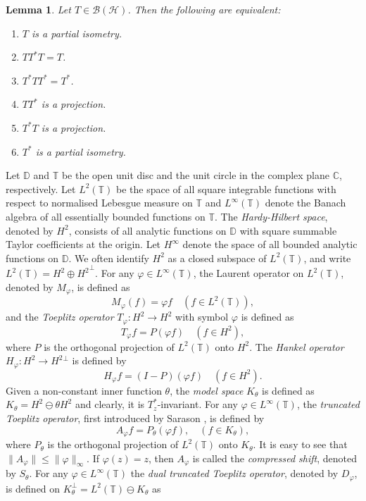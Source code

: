\documentclass[12pt]{amsart}
\newcommand{\clb}{\mathcal{B}}
\newcommand{\clh}{\mathcal{H}}
\newcommand{\C}{\mathbb{C}}
\newcommand{\D}{\mathbb{D}}
\newcommand{\T}{\mathbb{T}}
\newcommand{\h}{{H}^2}
\theoremstyle{definition}
\theoremstyle{plain}
\newtheorem{lem}[thm]{Lemma}
\theoremstyle{definition}
\numberwithin{equation}{section}
\let\phi=\varphi
\begin{document}
\begin{lem} \label{Lem:partial isometry equivalences}
Let $T\in \clb(\clh)$. Then the following are equivalent:
\begin{enumerate}
			\item $T$ is a partial isometry.
			\item $TT^*T=T$.
			\item $T^*TT^*=T^*$.
			\item $TT^*$ is a projection.
			\item $T^*T$ is a projection.
			\item $T^*$ is a partial isometry.
\end{enumerate}
\end{lem}	
	
	
Let $\D$ and $\T$ be the open unit disc and the unit circle in the complex plane $\C$, respectively. Let $L^2(\T)$ be the space of all square integrable functions with respect to normalised Lebesgue measure on $\T$ and $L^\infty(\T)$ denote the Banach algebra of all essentially bounded functions on $\T$. The \emph{Hardy-Hilbert space}, denoted by $\h$, consists of all analytic functions on $\D$ with square summable Taylor coefficients at the origin. Let $H^\infty$ denote the space of all bounded analytic functions on $\D$.
We often identify $H^2$ as a closed subspace of $L^2(\T)$, and write $L^2(\T)= H^2 \oplus {H^2}^{\perp}$. For any $\phi \in L^\infty(\T)$, the Laurent operator on $L^2(\T)$, denoted by $M_\phi$, is defined as
	\[
	M_\phi(f)=\phi f \quad (f \in L^2(\T)),
	\]
and the \textit{Toeplitz operator} $T_\phi: \h \rightarrow \h$ with symbol $\phi$ is defined as
	\[
	T_\phi f=P(\phi f) \quad (f \in \h),
	\] 
where $P$ is the orthogonal projection of $L^2(\T)$ onto $\h{}$. The \textit{Hankel operator} $H_\phi :\h \rightarrow \h{}^\perp$ is defined by
	\[
	H_\phi f= (I-P)(\phi f) \quad ( f\in \h).
	\]
Given a non-constant inner function $\theta$, the \textit{model space} $K_{\theta}$ is defined as $K_\theta = \h \ominus \theta \h$ and clearly, it is $T_z^*$-invariant. For any $\phi \in L^\infty(\T)$, the \textit{truncated Toeplitz operator}, first introduced by Sarason \cite{DS}, is defined by
	\[
	A_\phi f=P_\theta(\phi f), \quad (f \in K_\theta),
	\]
where $P_\theta$ is the orthogonal projection of $L^2(\T)$ onto $K_\theta$. It is easy to see that $\|A_\phi\| \leq \|\phi\|_\infty$. If $\phi(z)=z$, then $A_\phi$ is called the \textit{compressed shift}, denoted by $S_{\theta}$. For any $\phi \in L^\infty(\T)$ the \textit{dual truncated Toeplitz operator}, denoted by $D_\phi$, is defined on $K_{\theta}^{\perp} = L^2(\T) \ominus K_{\theta}$ as
\end{document}
